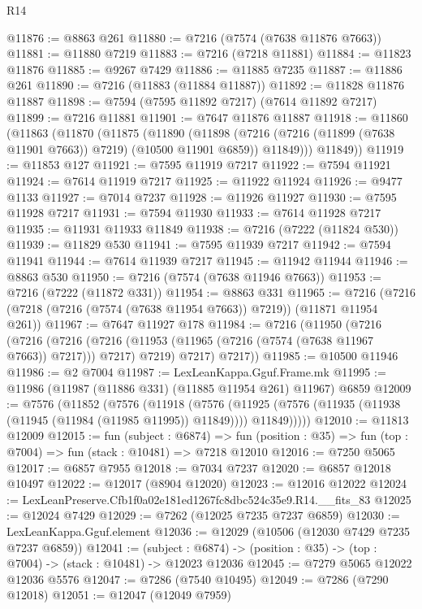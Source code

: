 \begin{lexlean}{R14}
\begin{coremodule}
@11876 := @8863 @261
@11880 := @7216 (@7574 (@7638 @11876 @7663))
@11881 := @11880 @7219
@11883 := @7216 (@7218 @11881)
@11884 := @11823 @11876
@11885 := @9267 @7429
@11886 := @11885 @7235
@11887 := @11886 @261
@11890 := @7216 (@11883 (@11884 @11887))
@11892 := @11828 @11876 @11887
@11898 := @7594 (@7595 @11892 @7217) (@7614 @11892 @7217)
@11899 := @7216 @11881
@11901 := @7647 @11876 @11887
@11918 := @11860
    (@11863
      (@11870
        (@11875
          (@11890
            (@11898
              (@7216 (@7216 (@11899 (@7638 @11901 @7663)) @7219) (@10500 @11901 @6859))
              @11849)))
        @11849))
@11919 := @11853 @127
@11921 := @7595 @11919 @7217
@11922 := @7594 @11921
@11924 := @7614 @11919 @7217
@11925 := @11922 @11924
@11926 := @9477 @1133
@11927 := @7014 @7237
@11928 := @11926 @11927
@11930 := @7595 @11928 @7217
@11931 := @7594 @11930
@11933 := @7614 @11928 @7217
@11935 := @11931 @11933 @11849
@11938 := @7216 (@7222 (@11824 @530))
@11939 := @11829 @530
@11941 := @7595 @11939 @7217
@11942 := @7594 @11941
@11944 := @7614 @11939 @7217
@11945 := @11942 @11944
@11946 := @8863 @530
@11950 := @7216 (@7574 (@7638 @11946 @7663))
@11953 := @7216 (@7222 (@11872 @331))
@11954 := @8863 @331
@11965 := @7216 (@7216 (@7218 (@7216 (@7574 (@7638 @11954 @7663)) @7219)) (@11871 @11954 @261))
@11967 := @7647 @11927 @178
@11984 := @7216
    (@11950
      (@7216
        (@7216
          (@7216 (@7216 (@11953 (@11965 (@7216 (@7574 (@7638 @11967 @7663)) @7217))) @7217) @7219)
          @7217)
        @7217))
@11985 := @10500 @11946
@11986 := @2 @7004
@11987 := LexLeanKappa.Gguf.Frame.mk
@11995 := @11986 (@11987 (@11886 @331) (@11885 @11954 @261) @11967) @6859
@12009 := @7576
    (@11852
      (@7576
        (@11918
          (@7576
            (@11925 (@7576 (@11935 (@11938 (@11945 (@11984 (@11985 @11995)) @11849)))) @11849)))))
@12010 := @11813 @12009
@12015 := fun (subject : @6874) =>
  fun (position : @35) => fun (top : @7004) => fun (stack : @10481) => @7218 @12010
@12016 := @7250 @5065
@12017 := @6857 @7955
@12018 := @7034 @7237
@12020 := @6857 @12018 @10497
@12022 := @12017 (@8904 @12020)
@12023 := @12016 @12022
@12024 := LexLeanPreserve.Cfb1f0a02e181ed1267fc8dbc524c35e9.R14.__fits_83
@12025 := @12024 @7429
@12029 := @7262 (@12025 @7235 @7237 @6859)
@12030 := LexLeanKappa.Gguf.element
@12036 := @12029 (@10506 (@12030 @7429 @7235 @7237 @6859))
@12041 := (subject : @6874) ->
  (position : @35) -> (top : @7004) -> (stack : @10481) -> @12023 @12036
@12045 := @7279 @5065 @12022 @12036 @5576
@12047 := @7286 (@7540 @10495)
@12049 := @7286 (@7290 @12018)
@12051 := @12047 (@12049 @7959)

\end{coremodule}
\end{lexlean}
